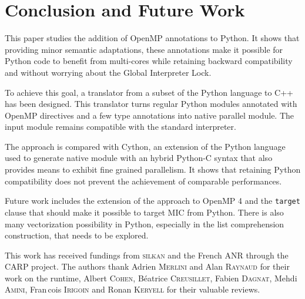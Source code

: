 \documentclass{sigplanconf}
\begin{document}
\section{Conclusion and Future Work}

This paper studies the addition of OpenMP annotations to Python. It shows that
providing minor semantic adaptations, these annotations make it possible for
Python code to benefit from multi-cores while retaining backward compatibility
and without worrying about the Global Interpreter Lock.

To achieve this goal, a translator from a subset of the Python language to C++
has been designed. This translator turns regular Python modules annotated with
OpenMP directives and a few type annotations into native parallel module. The
input module remains compatible with the standard interpreter.

The approach is compared with Cython, an extension of the Python language used
to generate native module with an hybrid Python-C syntax that also provides
means to exhibit fine grained parallelism. It shows that retaining Python
compatibility does not prevent the achievement of comparable performances.

Future work includes the extension of the approach to OpenMP 4 and the
\texttt{target} clause that should make it possible to target MIC from Python.
There is also many vectorization possibility in Python, especially in the list
comprehension construction, that needs to be explored.

\acks

This work has received fundings from \textsc{silkan} and the French ANR through the
CARP project. The authors thank Adrien \textsc{Merlini} and Alan
\textsc{Raynaud} for their work on the runtime, Albert \textsc{Cohen},
B{\'e}atrice \textsc{Creusillet}, Fabien \textsc{Dagnat}, Mehdi \textsc{Amini},
Fran{\,c}ois \textsc{Irigoin} and Ronan \textsc{Keryell} for their valuable
reviews.



\end{document}
